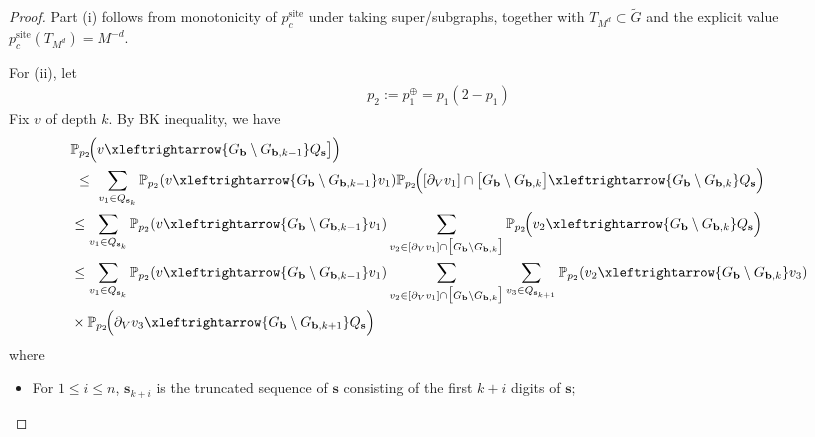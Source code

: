 \documentclass[11pt]{amsart}
\theoremstyle{plain}
\numberwithin{equation}{section}
\numberwithin{figure}{section}
\newcommand\PP{{\mathbb P}}
\begin{document}
\begin{proof}
Part (i) follows from monotonicity of $p_c^{\mathrm{site}}$ under taking super/subgraphs,
together with $T_{M^d}\subset \widetilde G$ and the explicit value $p_c^{\mathrm{site}}(T_{M^d})=M^{-d}$.


For (ii), let
\begin{align}
p_2:=p_1^\oplus=p_1(2-p_1)\label{dp2}
\end{align}
Fix $v$ of depth $k$. By BK inequality, we have
\begin{align*}
&\PP_{p_2}\!\Bigl(
v\xleftrightarrow{G_{\mathbf b}\setminus G_{\mathbf b,k-1}}
Q_{\mathbf s}\bigr]
\Bigr)\\
&\ \le\
\sum_{v_1\in Q_{\mathbf s_{k}}}\mathbb{P}_{p_2}(v\xleftrightarrow{G_{\mathbf b}\setminus G_{\mathbf b,k-1}}v_1)
\PP_{p_2}\!\Bigl(
[\partial_Vv_1]\cap \big[ G_{\mathbf b}\setminus G_{\mathbf b,k}\big]\xleftrightarrow{ G_{\mathbf b}\setminus G_{\mathbf b,k}}
Q_{\mathbf s}
\Bigr)
\\
&\leq \sum_{v_1\in Q_{\mathbf s_{k}}}\mathbb{P}_{p_2}(v\xleftrightarrow{ G_{\mathbf b}\setminus G_{\mathbf b,k-1}}v_1)
\sum_{v_2\in [\partial_Vv_1]\cap \big[ G_{\mathbf b}\setminus G_{\mathbf b,k}\big]}\PP_{p_2}\!\Bigl(v_2
\xleftrightarrow{ G_{\mathbf b}\setminus G_{\mathbf b,k}}
Q_{\mathbf s}
\Bigr)\\
&\leq \sum_{v_1\in Q_{\mathbf s_{k}}}\mathbb{P}_{p_2}(v\xleftrightarrow{ G_{\mathbf b}\setminus G_{\mathbf b,k-1}}v_1)
\sum_{v_2\in [\partial_Vv_1]\cap \big[ G_{\mathbf b}\setminus G_{\mathbf b,k}\big]}\sum_{v_3\in Q_{\mathbf{s}_{k+1}}}\PP_{p_2}(v_2\xleftrightarrow{G_{\mathbf{b}}\setminus G_{\mathbf{b},k}} v_3)
\\
&\times\PP_{p_2}\!\Bigl(\partial_V v_3
\xleftrightarrow{ G_{\mathbf b}\setminus G_{\mathbf b,k+1}}
Q_{\mathbf s}
\Bigr)
\end{align*}
where 
\begin{itemize}
\item For $1\leq i\leq n$, $\mathbf{s}_{k+i}$ is the truncated sequence of $\mathbf{s}$ consisting of the first $k+i$ digits of $\mathbf{s}$;
\end{itemize}


\end{proof}
\end{document}
